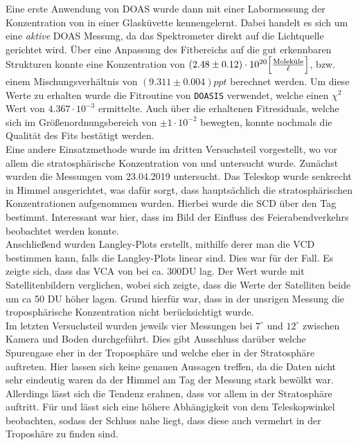 \documentclass[12pt, a4paper, bibliography=totoc]{scrartcl}
\begin{document}
\begin{multicols}{2}
Eine erste Anwendung von DOAS wurde dann mit einer Labormessung der Konzentration von  in einer Glasküvette kennengelernt. 
Dabei handelt es sich um eine \textit{aktive} DOAS Messung, da das Spektrometer direkt auf die Lichtquelle gerichtet wird. 
Über eine Anpassung des Fitbereichs auf die gut erkennbaren  Strukturen konnte eine Konzentration von $(2.48 \pm 0.12) \cdot 10^{20} \Bigl[ \frac{\text{Moleküle}}{\ell}\Bigr]$, bzw. einem Mischungsverhältnis von $(9.311 \pm 0.004) \si{ppt}$ berechnet werden. 
Um diese Werte zu erhalten wurde die Fitroutine von \verb*+DOASIS+ verwendet, welche einen $\chi^2$ Wert von $4.367 \cdot 10^{-3}$ ermittelte. Auch über die erhaltenen Fitresiduals, welche sich im Größenordnungsbereich von $\pm 1 \cdot 10^{-2}$ bewegten, konnte nochmals die Qualität des Fits bestätigt werden.\\

Eine andere Einsatzmethode wurde im dritten Versuchsteil vorgestellt, wo vor allem die stratosphärische Konzentration von  und  untersucht wurde.
Zunächst wurden die Messungen vom 23.04.2019 untersucht.
Das Teleskop wurde senkrecht in Himmel ausgerichtet, was dafür sorgt, dass hauptsächlich die stratosphärischen Konzentrationen aufgenommen wurden.
Hierbei wurde die SCD über den Tag bestimmt.
Interessant war hier, dass im  Bild der Einfluss des Feierabendverkehrs beobachtet werden konnte.\\
Anschließend wurden Langley-Plots erstellt, mithilfe derer man die VCD bestimmen kann, falls die Langley-Plots linear sind.
Dies war für  der Fall.
Es zeigte sich, dass das VCA von  bei ca. 300\si{DU} lag.
Der Wert wurde mit Satellitenbildern verglichen, wobei sich zeigte, dass die Werte der Satelliten beide um ca 50 \si{DU} höher lagen.
Grund hierfür war, dass in der unsrigen Messung die troposphärische Konzentration nicht berücksichtigt wurde.\\

Im letzten Versuchsteil wurden jeweils vier Messungen bei $7^\circ$ und $12^\circ$ zwischen Kamera und Boden durchgeführt.
Dies gibt Ausschluss darüber welche Spurengase eher in der Troposphäre und welche eher in der Stratosphäre auftreten.
Hier lassen sich keine genauen Aussagen treffen, da die Daten nicht sehr eindeutig waren da der Himmel am Tag der Messung stark bewölkt war.
Allerdings lässt sich die Tendenz erahnen, dass  vor allem in der Stratosphäre auftritt. Für  und  lässt sich eine höhere Abhängigkeit von dem Teleskopwinkel beobachten, sodass der Schluss nahe liegt, dass diese auch vermehrt in der Troposhäre zu finden sind.


\nocite{*}
\appendix
\end{multicols}
\newpage
\end{document}
